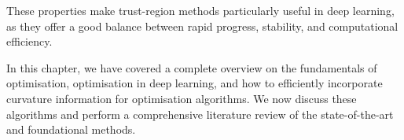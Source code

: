 These properties make trust-region methods particularly useful in deep learning, as they offer a good balance between rapid progress, stability, and computational efficiency. 


    
    

In this chapter, we have covered a complete overview on the fundamentals of optimisation, optimisation in deep learning, and how to efficiently incorporate curvature information for optimisation algorithms. We now discuss these algorithms and perform a comprehensive literature review of the state-of-the-art and foundational methods.